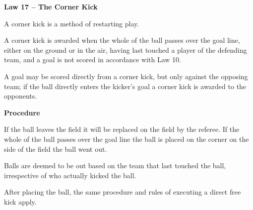 \clearpage
\sffamily
{\bfseries\color[rgb]{0.4,0.4,0.4}
Law 17 -- The Corner Kick}
{}


\bigskip

A corner kick is a method of restarting play.

\bigskip

A corner kick is awarded when the whole of the ball passes over the goal line, either on the ground or in the air, having last touched a player of the defending team, and a goal is not scored in accordance with Law 10.

\bigskip

A goal may be scored directly from a corner kick, but only against the opposing team;
if the ball directly enters the kicker's goal a corner kick is awarded to the opponents.

\bigskip

{\bfseries Procedure}

\headlinebox

If the ball leaves the field it will be replaced on the field by the referee.
If the whole of the ball passes over the goal line the ball is placed on the
corner on the side of the field the ball went out.

\bigskip

Balls are deemed to be out based on the team that last touched the ball,
irrespective of who actually kicked the ball. 

\bigskip

After placing the ball, the same procedure and rules of executing a direct free kick apply.

\bigskip


